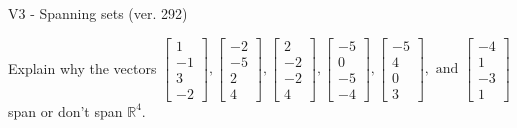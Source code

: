 \begin{exercise}
  \begin{exerciseTitle}V3 - Spanning sets (ver. 292)\end{exerciseTitle}
  \begin{exerciseStatement}
    Explain why the vectors \(\left[\begin{array}{r}
1 \\
-1 \\
3 \\
-2
\end{array}\right] , \left[\begin{array}{r}
-2 \\
-5 \\
2 \\
4
\end{array}\right] , \left[\begin{array}{r}
2 \\
-2 \\
-2 \\
4
\end{array}\right] , \left[\begin{array}{r}
-5 \\
0 \\
-5 \\
-4
\end{array}\right] , \left[\begin{array}{r}
-5 \\
4 \\
0 \\
3
\end{array}\right] , \text{ and } \left[\begin{array}{r}
-4 \\
1 \\
-3 \\
1
\end{array}\right]\) span or don't span \(\mathbb{R}^4\). 
	



\end{exerciseStatement}
\end{exercise}
